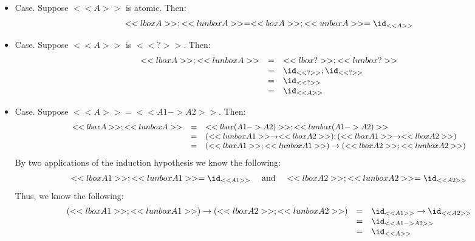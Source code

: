 \begin{itemize}
\item[] Case. Suppose $<<A>>$ is atomic.  Then:
  \[
    <<lbox A>>;<<lunbox A>> = <<box A>>;<<unbox A>> = \id_{<<A>>}
    \]
    
  \item[] Case. Suppose $<<A>>$ is $<<?>>$.  Then:
    \[
    \begin{array}{lll}
      <<lbox A>>;<<lunbox A>> & = & <<lbox ?>>;<<lunbox ?>>\\
      & = & \id_{<<?>>};\id_{<<?>>}\\
      & = & \id_{<<?>>}\\
      & = & \id_{<<A>>}
    \end{array}
    \]

  \item[] Case. Suppose $<<A>> = <<A1 -> A2>>$.  Then:
    \[\small
    \begin{array}{lll}
      <<lbox A>>;<<lunbox A>>
      & = & <<lbox (A1 -> A2)>>;<<lunbox (A1 -> A2)>>\\
      & = & (<<lunbox A1>> \to <<lbox A2>>);(<<lbox A1>> \to <<lbox A2>>)\\
      & = & (<<lbox A1>>;<<lunbox A1>>) \to (<<lbox A2>>;<<lunbox A2>>)\\
    \end{array}
    \]
    By two applications of the induction hypothesis we know the
    following:
    \[
    \begin{array}{lll}
      <<lbox A1>>;<<lunbox A1>> = \id_{<<A1>>} & \text{ and } & <<lbox A2>>;<<lunbox A2>> = \id_{<<A2>>}
    \end{array}
    \]
    Thus, we know the following:
    \[
    \begin{array}{lll}
      (<<lbox A1>>;<<lunbox A1>>) \to (<<lbox A2>>;<<lunbox A2>>)
      & = & \id_{<<A1>>} \to \id_{<<A2>>}\\
      & = & \id_{<<A1 -> A2>>}\\
      & = & \id_{<<A>>}
    \end{array}
    \]


\end{itemize}
